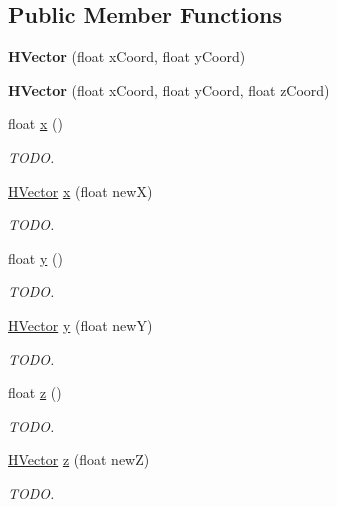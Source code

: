 \subsection*{Public Member Functions}
\begin{DoxyCompactItemize}
\item 
\hypertarget{classhype_1_1util_1_1_h_vector_a876fb3f042945cf01e83c7f11bcc29d4}{{\bfseries H\-Vector} (float x\-Coord, float y\-Coord)}\label{classhype_1_1util_1_1_h_vector_a876fb3f042945cf01e83c7f11bcc29d4}

\item 
\hypertarget{classhype_1_1util_1_1_h_vector_afe5eaa3e4277f2af8e7549eb0edf8d88}{{\bfseries H\-Vector} (float x\-Coord, float y\-Coord, float z\-Coord)}\label{classhype_1_1util_1_1_h_vector_afe5eaa3e4277f2af8e7549eb0edf8d88}

\item 
float \hyperlink{classhype_1_1util_1_1_h_vector_ada4aa034ee78e6b2193de65b876688f5}{x} ()
\begin{DoxyCompactList}\small\item\em T\-O\-D\-O. \end{DoxyCompactList}\item 
\hyperlink{classhype_1_1util_1_1_h_vector}{H\-Vector} \hyperlink{classhype_1_1util_1_1_h_vector_a7c0ee8dc0c04087d7b9c2de85b82a2be}{x} (float new\-X)
\begin{DoxyCompactList}\small\item\em T\-O\-D\-O. \end{DoxyCompactList}\item 
float \hyperlink{classhype_1_1util_1_1_h_vector_ace575b495f22952997ceaa6c171934a1}{y} ()
\begin{DoxyCompactList}\small\item\em T\-O\-D\-O. \end{DoxyCompactList}\item 
\hyperlink{classhype_1_1util_1_1_h_vector}{H\-Vector} \hyperlink{classhype_1_1util_1_1_h_vector_afeeb655afa147c61a1e0843fdd6b5202}{y} (float new\-Y)
\begin{DoxyCompactList}\small\item\em T\-O\-D\-O. \end{DoxyCompactList}\item 
float \hyperlink{classhype_1_1util_1_1_h_vector_a19ed38d329935215aef5f0c93bdb1b57}{z} ()
\begin{DoxyCompactList}\small\item\em T\-O\-D\-O. \end{DoxyCompactList}\item 
\hyperlink{classhype_1_1util_1_1_h_vector}{H\-Vector} \hyperlink{classhype_1_1util_1_1_h_vector_a2f926d05dbfa381a3add77a6c93f6385}{z} (float new\-Z)
\begin{DoxyCompactList}\small\item\em T\-O\-D\-O. \end{DoxyCompactList}\end{DoxyCompactItemize}
